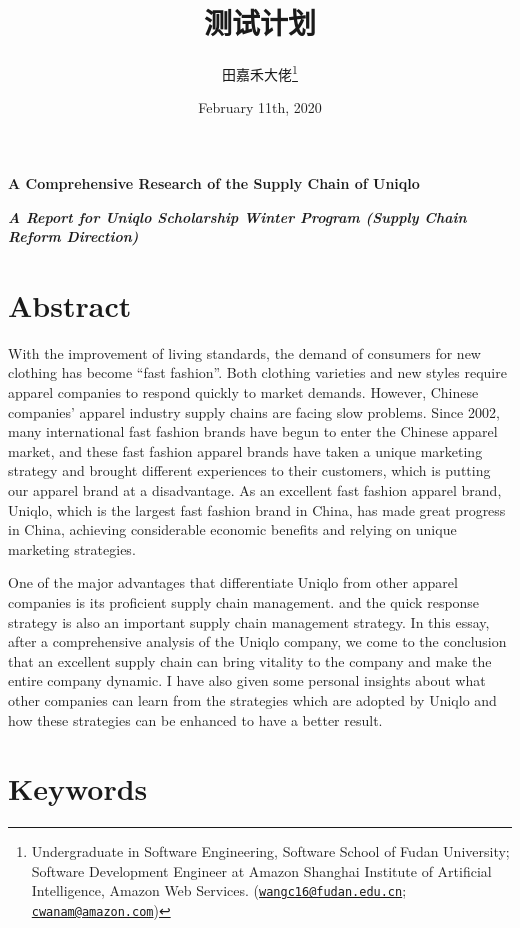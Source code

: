 \documentclass[hyperref, a4paper]{ctexart}
\title{\vspace{2in} 测试计划\\\vspace{0.5em}{\large A Report for Uniqlo Scholarship Winter Program (Supply Chain Reform
Direction)}}
\author{田嘉禾大佬\footnote{Undergraduate in Software Engineering, Software
  School of Fudan University; Software Development Engineer at Amazon
  Shanghai Institute of Artificial Intelligence, Amazon Web Services.
  (\href{mailto:wangc16@fudan.edu.cn}{\nolinkurl{wangc16@fudan.edu.cn}};
  \href{mailto:cwanam@amazon.com}{\nolinkurl{cwanam@amazon.com}})}}
\date{February 11th, 2020}
\begin{document}
\maketitle

\newpage

\LARGE

\begin{center}
\textbf{A Comprehensive Research of the Supply Chain of Uniqlo}
\end{center}

\large
\begin{center}
\textbf{\emph{A Report for Uniqlo Scholarship Winter Program (Supply Chain Reform Direction)}}
\end{center}

\hypertarget{abstract}{%
\section*{Abstract}\label{abstract}}

With the improvement of living standards, the demand of consumers for
new clothing has become ``fast fashion''. Both clothing varieties and
new styles require apparel companies to respond quickly to market
demands. However, Chinese companies' apparel industry supply chains are
facing slow problems. Since 2002, many international fast fashion brands
have begun to enter the Chinese apparel market, and these fast fashion
apparel brands have taken a unique marketing strategy and brought
different experiences to their customers, which is putting our apparel
brand at a disadvantage. As an excellent fast fashion apparel brand,
Uniqlo, which is the largest fast fashion brand in China, has made great
progress in China, achieving considerable economic benefits and relying
on unique marketing strategies.

One of the major advantages that differentiate Uniqlo from other apparel
companies is its proficient supply chain management. and the quick
response strategy is also an important supply chain management strategy.
In this essay, after a comprehensive analysis of the Uniqlo company, we
come to the conclusion that an excellent supply chain can bring vitality
to the company and make the entire company dynamic. I have also given
some personal insights about what other companies can learn from the
strategies which are adopted by Uniqlo and how these strategies can be
enhanced to have a better result.

\hypertarget{keywords}{%
\section*{Keywords}\label{keywords}}
\end{document}
